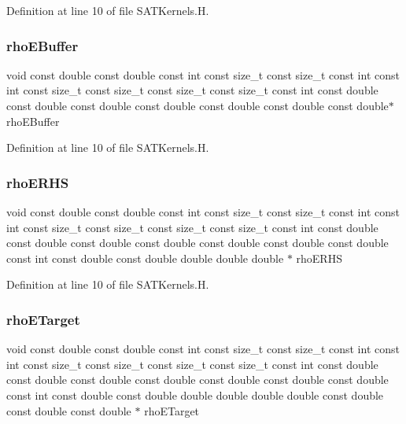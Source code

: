 Definition at line 10 of file S\+A\+T\+Kernels.\+H.

\hypertarget{SATKernels_8H_a08911833ae2c771ec222ca0450100363}{}\label{SATKernels_8H_a08911833ae2c771ec222ca0450100363} 
\subsubsection{\texorpdfstring{rho\+E\+Buffer}{rhoEBuffer}}
{\footnotesize\ttfamily void const double const double const int const size\+\_\+t const size\+\_\+t const int const int const size\+\_\+t const size\+\_\+t const size\+\_\+t const size\+\_\+t const int const double const double const double const double const double const double const double$\ast$ rho\+E\+Buffer}



Definition at line 10 of file S\+A\+T\+Kernels.\+H.

\hypertarget{SATKernels_8H_a86b34d656c3893a42fbedf44ade01dc7}{}\label{SATKernels_8H_a86b34d656c3893a42fbedf44ade01dc7} 
\subsubsection{\texorpdfstring{rho\+E\+R\+HS}{rhoERHS}}
{\footnotesize\ttfamily void const double const double const int const size\+\_\+t const size\+\_\+t const int const int const size\+\_\+t const size\+\_\+t const size\+\_\+t const size\+\_\+t const int const double const double const double const double const double const double const double const int const double const double double double double $\ast$ rho\+E\+R\+HS}



Definition at line 10 of file S\+A\+T\+Kernels.\+H.

\hypertarget{SATKernels_8H_a77cd7df787748ecffdb67100fb5ae013}{}\label{SATKernels_8H_a77cd7df787748ecffdb67100fb5ae013} 
\subsubsection{\texorpdfstring{rho\+E\+Target}{rhoETarget}}
{\footnotesize\ttfamily void const double const double const int const size\+\_\+t const size\+\_\+t const int const int const size\+\_\+t const size\+\_\+t const size\+\_\+t const size\+\_\+t const int const double const double const double const double const double const double const double const int const double const double double double double double const double const double const double $\ast$ rho\+E\+Target}



